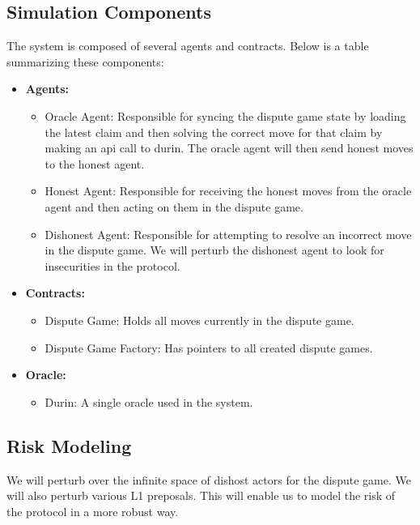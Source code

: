 \subsection{Simulation Components}\label{simulation-components}

The system is composed of several agents and contracts. Below is a table
summarizing these components:

\begin{itemize}
\item \textbf{Agents:}
  \begin{itemize}
  \item Oracle Agent: Responsible for syncing the dispute game state by loading the latest claim and then solving the correct move for that claim by making an api call to durin. The oracle agent will then send honest moves to the honest agent.
  \item Honest Agent: Responsible for receiving the honest moves from the oracle agent and then acting on them in the dispute game.
  \item Dishonest Agent: Responsible for attempting to resolve an incorrect move in the dispute game. We will perturb the dishonest agent to look for insecurities in the protocol.
  \end{itemize}
\item \textbf{Contracts:}
  \begin{itemize}
  \item Dispute Game: Holds all moves currently in the dispute game.
  \item Dispute Game Factory: Has pointers to all created dispute games.
  \end{itemize}
\item \textbf{Oracle:}
  \begin{itemize}
  \item Durin: A single oracle used in the system.
  \end{itemize}
\end{itemize}


\subsection{Risk Modeling}\label{risk-modeling}

We will perturb over the infinite space of dishost actors for the
dispute game. We will also perturb various L1 preposals. This will
enable us to model the risk of the protocol in a more robust way.

